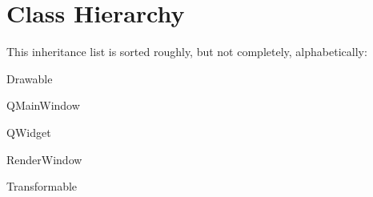 \section{Class Hierarchy}
This inheritance list is sorted roughly, but not completely, alphabetically\-:\begin{DoxyCompactList}
\item Drawable\begin{DoxyCompactList}
\item {}
\end{DoxyCompactList}
\item {}
\begin{DoxyCompactList}
\item {}
\end{DoxyCompactList}
\item {}
\item {}
\item {}
\item Q\-Main\-Window\begin{DoxyCompactList}
\item {}
\end{DoxyCompactList}
\item Q\-Widget\begin{DoxyCompactList}
\item {}
\begin{DoxyCompactList}
\item {}
\end{DoxyCompactList}
\end{DoxyCompactList}
\item Render\-Window\begin{DoxyCompactList}
\item {}
\end{DoxyCompactList}
\item Transformable\begin{DoxyCompactList}
\item {}
\end{DoxyCompactList}
\end{DoxyCompactList}
